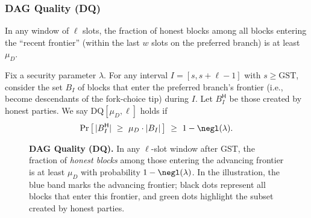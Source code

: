 \subsubsection{DAG Quality (DQ)} 
\label{app:DQ}

In any window of $\ell$ slots, the fraction of honest blocks among all blocks entering the “recent frontier” (within the last $w$ slots on the preferred branch) is at least $\mu_D$.



\begin{definition}\label{appdef:DQ}
Fix a security parameter $\lambda$. For any interval $I=[s,s+\ell-1]$ with $s\ge \mathrm{GST}$, consider the set $B_I$ of blocks that enter the preferred branch's frontier (i.e., become descendants of the fork-choice tip) during $I$. Let $B_I^{\mathsf{H}}$ be those created by honest parties.
We say $\mathrm{DQ}[\mu_D,\ell]$ holds if
\begin{equation*}
\Pr\big[\,|B_I^{\mathsf{H}}|\ \ge\ \mu_D \cdot |B_I|\,\big]\ \ge\ 1-\negl(\lambda).
\end{equation*}
\end{definition}

\begin{figure}[htp!]
\centering
{}
\caption{\textbf{DAG Quality (DQ).} 
\small 
In any $\ell$-slot window after GST, the fraction of \emph{honest blocks} among those entering the advancing frontier is at least $\mu_D$ with probability $1-\negl(\lambda)$. 
In the illustration, the blue band marks the advancing frontier; 
black dots represent all blocks that enter this frontier, 
and green dots highlight the subset created by honest parties.}
\label{fig:dq}
\end{figure}





